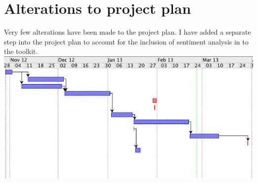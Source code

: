 \documentclass{report}
\begin{document}
\section*{Alterations to project plan}
Very few alterations have been made to the project plan. I have added a separate step into the project plan to account for the inclusion of sentiment analysis in to the toolkit.
\includegraphics[scale=0.5]{ProjPlan.png}
\end{document}
